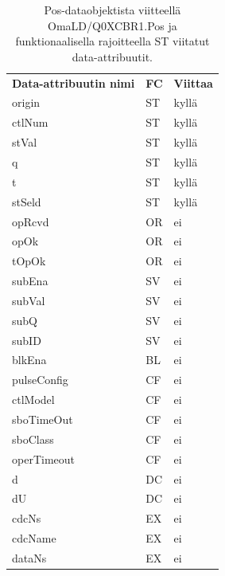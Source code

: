\begin{table}[ht!]
	\caption{Pos-dataobjektista viitteellä OmaLD/Q0XCBR1.Pos ja funktionaalisella rajoitteella ST viitatut data-attribuutit.}
	\label{tab:fc-usage-example}
	\begin{tabular}{l | l | l }
		\hline
		\textbf{Data-attribuutin nimi} & \textbf{FC} & \textbf{Viittaa} \\
		origin & ST & kyllä \\
		ctlNum & ST & kyllä \\
		stVal & ST & kyllä \\
		q & ST & kyllä \\
		t & ST & kyllä \\
		stSeld & ST & kyllä \\
		opRcvd & OR & ei \\
		opOk & OR & ei \\
		tOpOk & OR & ei \\
		subEna & SV & ei \\
		subVal & SV & ei \\
		subQ & SV & ei \\
		subID & SV & ei \\
		blkEna & BL & ei \\
		pulseConfig & CF & ei \\
		ctlModel & CF & ei \\
		sboTimeOut & CF & ei \\
		sboClass & CF & ei \\
		operTimeout & CF & ei \\
		d & DC & ei \\
		dU & DC & ei \\
		cdcNs & EX & ei \\
		cdcName & EX & ei \\
		dataNs & EX & ei \\
		\hline
	\end{tabular}
\end{table}

